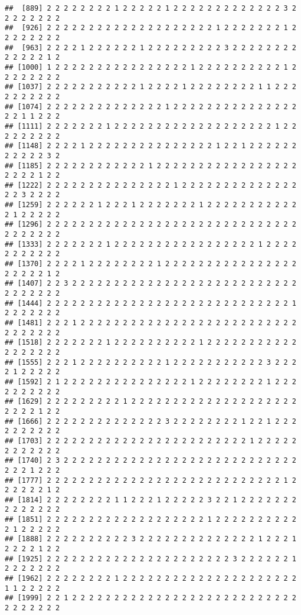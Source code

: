 \documentclass[
]{article}
\begin{document}
\begin{verbatim}
##  [889] 2 2 2 2 2 2 2 2 1 2 2 2 2 2 1 2 2 2 2 2 2 2 2 2 2 2 2 2 3 2 2 2 2 2 2 2 2
##  [926] 2 2 2 2 2 2 2 2 2 2 2 2 2 2 2 2 2 2 2 2 1 2 2 2 2 2 2 2 1 2 2 2 2 2 2 2 2
##  [963] 2 2 2 2 1 2 2 2 2 2 2 1 2 2 2 2 2 2 2 2 2 3 2 2 2 2 2 2 2 2 2 2 2 2 2 1 2
## [1000] 1 2 2 2 2 2 2 2 2 2 2 2 2 2 2 2 2 1 2 2 2 2 2 2 2 2 2 2 1 2 2 2 2 2 2 2 2
## [1037] 2 2 2 2 2 2 2 2 2 2 2 1 2 2 2 2 1 2 2 2 2 2 2 2 2 1 1 2 2 2 2 2 2 2 2 2 2
## [1074] 2 2 2 2 2 2 2 2 2 2 2 2 2 2 1 2 2 2 2 2 2 2 2 2 2 2 2 2 2 2 2 2 1 1 2 2 2
## [1111] 2 2 2 2 2 2 2 1 2 2 2 2 2 2 2 2 2 2 2 2 2 2 2 2 2 2 2 1 2 2 2 2 2 2 2 2 2
## [1148] 2 2 2 2 1 2 2 2 2 2 2 2 2 2 2 2 2 2 2 2 1 2 2 1 2 2 2 2 2 2 2 2 2 2 2 3 2
## [1185] 2 2 2 2 2 2 2 2 2 2 2 2 1 2 2 2 2 2 2 2 2 2 2 2 2 2 2 2 2 2 2 2 2 2 1 2 2
## [1222] 2 2 2 2 2 2 2 2 2 2 2 2 2 2 2 1 2 2 2 2 2 2 2 2 2 2 2 2 2 2 2 2 3 2 2 2 2
## [1259] 2 2 2 2 2 2 1 2 2 2 1 2 2 2 2 2 2 2 1 2 2 2 2 2 2 2 2 2 2 2 2 1 2 2 2 2 2
## [1296] 2 2 2 2 2 2 2 2 2 2 2 2 2 2 2 2 2 2 2 2 2 2 2 2 2 2 2 2 2 2 2 2 2 2 2 2 2
## [1333] 2 2 2 2 2 2 2 1 2 2 2 2 2 2 2 2 2 2 2 2 2 2 2 2 2 1 2 2 2 2 2 2 2 2 2 2 2
## [1370] 2 2 2 2 1 2 2 2 2 2 2 2 2 1 2 2 2 2 2 2 2 2 2 2 2 2 2 2 2 2 2 2 2 2 2 1 2
## [1407] 2 2 3 2 2 2 2 2 2 2 2 2 2 2 2 2 2 2 2 2 2 2 2 2 2 2 2 2 2 2 2 2 2 2 2 2 2
## [1444] 2 2 2 2 2 2 2 2 2 2 2 2 2 2 2 2 2 2 2 2 2 2 2 2 2 2 2 2 2 1 2 2 2 2 2 2 2
## [1481] 2 2 2 1 2 2 2 2 2 2 2 2 2 2 2 2 2 2 2 2 2 2 2 2 2 2 2 2 2 2 2 2 2 2 2 2 2
## [1518] 2 2 2 2 2 2 2 1 2 2 2 2 2 2 2 2 2 2 1 2 2 2 2 2 2 2 2 2 2 2 2 2 2 2 2 2 2
## [1555] 2 2 2 1 2 2 2 2 2 2 2 2 2 2 1 2 2 2 2 2 2 2 2 2 2 2 3 2 2 2 2 1 2 2 2 2 2
## [1592] 2 1 2 2 2 2 2 2 2 2 2 2 2 2 2 2 2 1 2 2 2 2 2 2 2 2 1 2 2 2 2 2 2 2 2 2 2
## [1629] 2 2 2 2 2 2 2 2 2 1 2 2 2 2 2 2 2 2 2 2 2 2 2 2 2 2 2 2 2 2 2 2 2 2 1 2 2
## [1666] 2 2 2 2 2 2 2 2 2 2 2 2 2 2 3 2 2 2 2 2 2 2 2 1 2 2 1 2 2 2 2 2 2 2 2 2 2
## [1703] 2 2 2 2 2 2 2 2 2 2 2 2 2 2 2 2 2 2 2 2 2 2 2 2 1 2 2 2 2 2 2 2 2 2 2 2 2
## [1740] 2 3 2 2 2 2 2 2 2 2 2 2 2 2 2 2 2 2 2 2 2 2 2 2 2 2 2 2 2 2 2 2 2 1 2 2 2
## [1777] 2 2 2 2 2 2 2 2 2 2 2 2 2 2 2 2 2 2 2 2 2 2 2 2 2 2 2 2 1 2 2 2 2 2 2 1 2
## [1814] 2 2 2 2 2 2 2 2 1 1 2 2 2 1 2 2 2 2 2 3 2 2 1 2 2 2 2 2 2 2 2 2 2 2 2 2 2
## [1851] 2 2 2 2 2 2 2 2 2 2 2 2 2 2 2 2 2 2 2 1 2 2 2 2 2 2 2 2 2 2 2 1 2 2 2 2 2
## [1888] 2 2 2 2 2 2 2 2 2 2 3 2 2 2 2 2 2 2 2 2 2 2 2 2 2 1 2 2 2 1 2 2 2 2 1 2 2
## [1925] 2 2 2 2 2 2 2 2 2 2 2 2 2 2 2 2 2 2 2 2 2 2 3 2 2 2 2 2 2 1 2 2 2 2 2 2 2
## [1962] 2 2 2 2 2 2 2 2 1 2 2 2 2 2 2 2 2 2 2 2 2 2 2 2 2 2 2 2 2 2 1 1 2 2 2 2 2
## [1999] 2 2 1 2 2 2 2 2 2 2 2 2 2 2 2 2 2 2 2 2 2 2 2 2 2 2 2 2 2 2 2 2 2 2 2 2 2

\end{verbatim}
\end{document}
